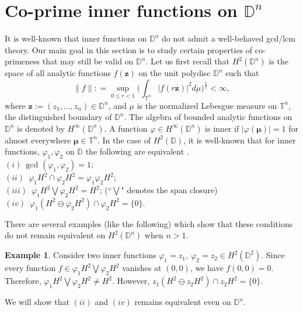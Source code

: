 \documentclass[12pt, a4 paper]{amsart}
\newcommand{\D}{\mathbb{D}}
\theoremstyle{definition}
\theoremstyle{plain}
\theoremstyle{definition}
\newtheorem{ex}[thm]{Example}
\numberwithin{equation}{section}
\let\phi=\varphi
\begin{document}
\section{Co-prime inner functions on {$\D^n$}}\label{sec5}
It is well-known that inner functions on $\D^n$ do not admit a well-behaved gcd/lcm theory. Our main goal in this section is to study certain properties of co-primeness that may still be valid on $\D^n$. Let us first recall that $H^2(\D^n)$ is the space of all analytic functions $f(\bm{z})$ on the unit polydisc $\D^n$ such that 
\[
\|f\|: = \sup_{0 \leq r<1} \big( \int_{\mathbb{T}^n} |f(r \bm{z})|^2 d\mu \big)^{\frac{1}{2}} < \infty,
\]
where $\bm{z}:= (z_1,\ldots,z_n) \in \D^n$, and $\mu$ is the normalized Lebesgue measure on $\mathbb{T}^n$, the distinguished boundary of $\D^n$. The algebra of bounded analytic functions on $\D^n$ is denoted by $H^{\infty}(\D^n)$. A function $\phi \in H^{\infty}(\D^n)$ is inner if $|\phi(\bm{\mu})| = 1 $ for almost everywhere $\bm{\mu} \in \mathbb{T}^n$. In the case of $H^2(\D)$, it is well-known that for inner functions, $\phi_1,\phi_2$ on $\D$ the following are equivalent \cite{GMR}.\\ \vspace{1mm}
$(i)$~$\mbox{gcd }(\phi_1,\phi_2)=1$; \\ \vspace{1mm}
$(ii)$~$\phi_1H^2\cap \phi_2 H^2=\phi_1\phi_2 H^2$;\\ \vspace{1mm}
$(iii)$~$\phi_1H^2\bigvee \phi_2 H^2=H^2$; { (``$\bigvee$" denotes the span closure)}\\ \vspace{1mm}
$(iv)$~$\phi_1(H^2\ominus\phi_2H^2)\cap\phi_2H^2=\{0\}$.

There are several examples (like the following) which show that these conditions do not remain equivalent on $H^2(\D^n)$ when $n>1$.
\begin{ex}
Consider two inner functions $\phi_1=z_1,~\phi_2=z_2\in H^2(\mathbb{D}^2).$ Since every function  $f\in \phi_1H^2\bigvee \phi_2H^2$ vanishes at $(0,0)$, we have $f(0,0)=0$. Therefore, $\phi_1H^2\bigvee \phi_2H^2\neq H^2$. However, $z_1(H^2\ominus z_2H^2)\cap z_2H^2=\{0\}$.
\end{ex}
We will show that $(ii)$ and $(iv)$ remains equivalent even on $\D^n$. 
\end{document}
